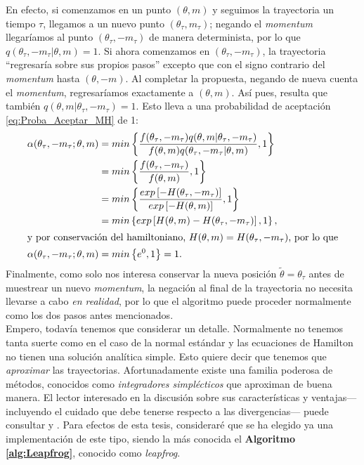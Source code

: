 En efecto, si comenzamos en un punto $(\theta,m)$ y seguimos la trayectoria un tiempo $\tau$, llegamos a un nuevo punto $(\theta_\tau,m_\tau)$; negando el \textit{momentum} llegaríamos al punto $(\theta_\tau,-m_\tau)$ de manera determinista, por lo que  $q(\theta_\tau,-m_\tau|\theta,m) = 1$. Si ahora comenzamos en $(\theta_\tau,-m_\tau)$, la trayectoria ``regresaría sobre sus propios pasos'' excepto que con el signo contrario del \textit{momentum} hasta $(\theta,-m)$. Al completar la propuesta, negando de nueva cuenta el \textit{momentum}, regresaríamos exactamente a $(\theta,m)$. Así pues, resulta que también $q(\theta,m|\theta_\tau,-m_\tau) = 1$. Esto lleva a una probabilidad de aceptación \eqref{eq:Proba_Aceptar_MH} de 1:
\begin{align}
\alpha(\theta_\tau,-m_\tau;\theta,m) &= min\left\lbrace\dfrac{f(\theta_\tau,-m_\tau)q(\theta,m|\theta_\tau,-m_\tau)}{f(\theta,m)q(\theta_\tau,-m_\tau|\theta,m)},1\right\rbrace \nonumber \\
&= min\left\lbrace\dfrac{f(\theta_\tau,-m_\tau)}{f(\theta,m)},1\right\rbrace \nonumber\\
&= min\left\lbrace\dfrac{exp\left[ -H(\theta_\tau,-m_\tau)\right]}{exp\left[ -H(\theta,m)\right]},1\right\rbrace \nonumber\\
&= min\left\lbrace exp\left[ H(\theta,m)-H(\theta_\tau,-m_\tau)\right],1\right\rbrace, \nonumber\\
\intertext{y por conservación del hamiltoniano, $H(\theta,m)=H(\theta_\tau,-m_\tau)$, por lo que}
\alpha(\theta_\tau,-m_\tau;\theta,m)&= min\left\lbrace e^0,1\right\rbrace = 1.
\label{eq:Proba_Acepta_HMC_ideal}
\end{align}
Finalmente, como solo nos interesa conservar la nueva posición $\tilde{\theta}=\theta_\tau$ antes de muestrear un nuevo \textit{momentum}, la negación al final de la trayectoria no necesita llevarse a cabo \textit{en realidad}, por lo que el algoritmo puede proceder normalmente como los dos pasos antes mencionados.\\

Empero, todavía tenemos que considerar un detalle. Normalmente no tenemos tanta suerte como en el caso de la normal estándar y las ecuaciones de Hamilton no tienen una solución analítica simple. Esto quiere decir que tenemos que \textit{aproximar} las trayectorias. Afortunadamente existe una familia poderosa de métodos, conocidos como \textit{integradores simplécticos} que aproximan de buena manera. El lector interesado en la discusión sobre sus características y ventajas--- incluyendo el cuidado que debe tenerse respecto a las divergencias--- puede consultar \textcite{Betancourt17} y \textcite{Neal93}. Para efectos de esta tesis, consideraré que se ha elegido ya una implementación de este tipo, siendo la más conocida el \textbf{Algoritmo \ref{alg:Leapfrog}}, conocido como \textit{leapfrog}. \\

